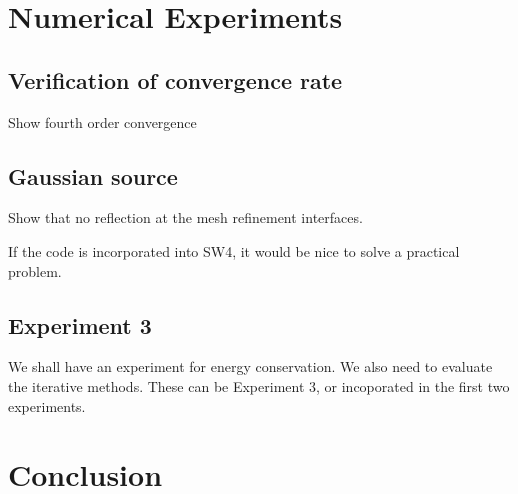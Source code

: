 \documentclass[a4paper]{article}
\begin{document}
\section{Numerical Experiments}

\subsection{Verification of convergence rate}
Show fourth order convergence

\subsection{Gaussian source}
Show that no reflection at the mesh refinement interfaces. 

If the code is incorporated into SW4, it would be nice to solve a practical problem. 

\subsection{Experiment 3}
We shall have an experiment for energy conservation. We also need to evaluate the iterative methods. These can be Experiment 3, or incoporated in the first two experiments.

\section{Conclusion}
\end{document}
